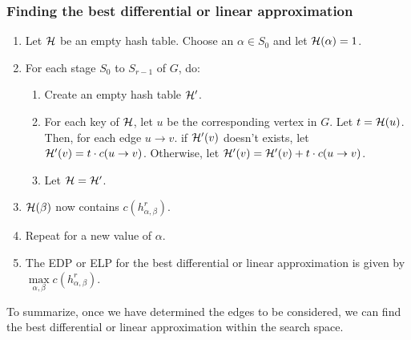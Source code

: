 \subsubsection{Finding the best differential or linear approximation}
\begin{enumerate}
    \item Let $\mathcal{H}$ be an empty hash table. Choose an $\alpha\in S_0$ and let $\mathcal{H}(\alpha)=1$.
    \item For each stage $S_0$ to $S_{r-1}$ of $G$, do:
    \begin{enumerate}
        \item Create an empty hash table $\mathcal{H}'$.
        \item For each key of $\mathcal{H}$, let $u$ be the corresponding vertex in $G$. Let $t=\mathcal{H}(u)$. Then, for each edge $u\rightarrow v$. if $\mathcal{H}'(v)$ doesn't exists, let $\mathcal{H}'(v)=t\cdot c(u\rightarrow v)$. Otherwise, let $\mathcal{H}'(v)=\mathcal{H}'(v)+t\cdot c(u\rightarrow v)$.
        \item Let $\mathcal{H}=\mathcal{H}'$.
    \end{enumerate}
    \item $\mathcal{H}(\beta)$ now contains $c(h^r_{\alpha,\beta})$.
    \item Repeat for a new value of $\alpha$.
    \item The EDP or ELP for the best differential or linear approximation is given by $\max\limits_{\alpha,\beta}c(h^r_{\alpha,\beta})$.
\end{enumerate}

To summarize, once we have determined the edges to be considered, we can find the best differential or linear approximation within the search space. 